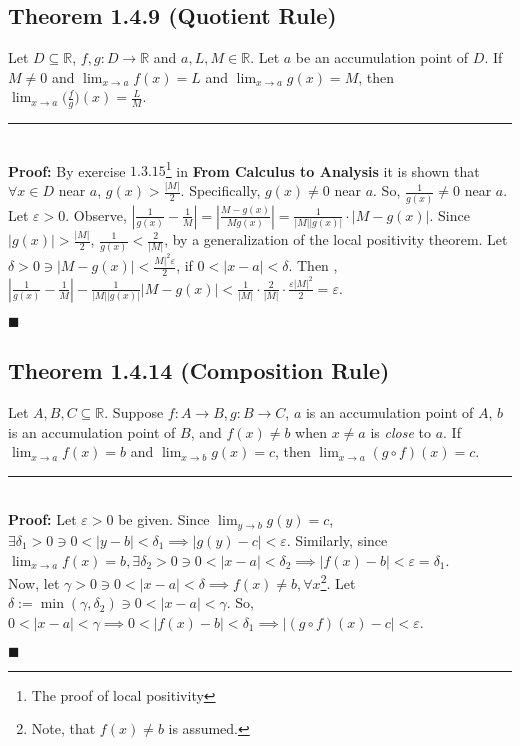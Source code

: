 \documentclass[11pt]{book}
\newcommand{\R}{\mathbb{R}}
\newcommand{\horline}{\noindent\rule{14.25cm}{0.6pt}\\}
\newcounter{theorem}
\newcommand{\QED}{\begin{flushright}$\blacksquare$\end{flushright}}
\begin{document}
	\subsection{Theorem 1.4.9 (Quotient Rule)}
		\begin{theor}
			Let $D \subseteq \R$, $f,g:D \to \R$ and $a,L,M \in \R$. Let $a$ be an accumulation point of $D$. If $M \neq 0$ and $\displaystyle\lim_{x \to a}
			{f(x) = L}$ and $\displaystyle\lim_{x \to a}{g(x) = M}$, then $\displaystyle\lim_{x \to a}{\bigg(\frac{f}{g}\bigg)(x) = \frac{L}{M}}$.\\
			\horline
			\textbf{Proof:} By exercise $1.3.15$\footnote{The proof of local positivity}
			in \textbf{From Calculus to Analysis} it is shown that $\forall x \in D$ near $a$, $g(x) > \frac{|M|}{2}$.
			Specifically, $g(x) \neq 0$ near $a$. So, $\frac{1}{g(x)} \neq 0$ near $a$. Let $\varepsilon > 0$. Observe, $|\frac{1}{g(x)} - \frac{1}{M}| = 
			|\frac{M - g(x)}{Mg(x)}| = \frac{1}{|M||g(x)|} \cdot |M - g(x)|$. Since $|g(x)| > \frac{|M|}{2}$, $\frac{1}{g(x)} < \frac{2}{|M|}$, by a 
			generalization of the local positivity theorem. Let $\delta > 0 \ni |M - g(x)| < \frac{M|^2 \varepsilon}{2}$, if $0 < |x - a| < \delta$.
			Then ,$|\frac{1}{g(x)} - \frac{1}{M}| - \frac{1}{|M||g(x)|}|M - g(x)| < \frac{1}{|M|} \cdot \frac{2}{|M|} \cdot \frac{\varepsilon |M|^2}{2} =
			\varepsilon$.
			\QED
		\end{theor}

	\subsection{Theorem 1.4.14 (Composition Rule)}
		\begin{theor}
			Let $A,B,C \subseteq \R$. Suppose $f:A \to B, g: B \to C$, $a$ is an accumulation point of $A$, $b$ is an accumulation point of $B$, and $f(x) \neq b$
			when $x \neq a$ is \emph{close} to $a$. If $\displaystyle\lim_{x \to a}{f(x) = b}$ and $\displaystyle\lim_{x \to b}{g(x) = c}$, then 
			$\displaystyle\lim_{x \to a}{(g \circ f)(x) = c}$.\\
			\horline
			\textbf{Proof:} Let $\varepsilon > 0$ be given. Since $\displaystyle\lim_{y \to b}{g(y) = c}$, $\exists \delta_1 > 0 \ni 0 < |y -b| < \delta_1 \implies
			|g(y) - c| < \varepsilon$. Similarly, since $\lim_{x \to a}{f(x) = b}, \exists \delta_2 > 0 \ni 0 < |x-a| < \delta_2 \implies |f(x) - b| < \varepsilon
			= \delta_1$.\\
			Now, let $\gamma > 0 \ni 0 < |x-a| < \delta \implies f(x) \neq b, \forall x$\footnote{Note, that $f(x) \neq b$ is assumed.}. Let $\delta := \min(\gamma,
			\delta_2) \ni 0 < |x-a|<\gamma$. So, $0 < |x-a| < \gamma \implies 0 < |f(x) - b| < \delta_1 \implies |(g \circ f)(x) - c| < \varepsilon$.
			\QED
		\end{theor}
		\newpage
\end{document}
